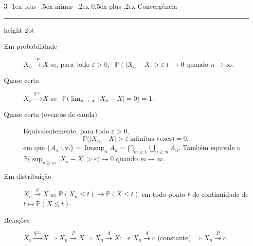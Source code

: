 \documentclass[10pt,landscape]{article}
\makeatletter
\renewcommand{\P}{\mathbb{P}}
\newcommand{\qc}{\xrightarrow{q.c.}}
\newcommand{\dto}{\xrightarrow{d}}
\newcommand{\pto}{\xrightarrow{P}}
\renewcommand{\section}{\@startsection{section}{1}{0mm}%
                                {-1ex plus -.5ex minus -.2ex}%
                                {0.5ex plus .2ex}%
                                {\normalfont\small\bfseries}}
\newcommand{\secrule}{\smallskip \hrule height 2pt \smallskip}
\makeatother
\begin{document}
\begin{multicols}{3}
\section{Convergência}\secrule
\begin{description}
  \item[Em probabilidade] $X_n\pto X$ se, para todo $\varepsilon>0$, \ $\P(|X_n-X|>\varepsilon)\to0$ quando $n\to\infty$.
  \item[Quase certa] $X_n\qc X$ se \ $\P\big(\lim_{n\to\infty}|X_n-X|=0\big)=1$.
  \item[Quase certa (eventos de cauda)] Equivalentemente, para todo $\varepsilon>0$,
  \[\P\big(|X_n-X|>\varepsilon\ \text{infinitas vezes}\big)=0,\]
  em que $\{A_n\text{ i.v.}\}=\limsup_nA_n=\bigcap_{m\ge1}\bigcup_{n\ge m}A_n$. Também equivale a $\P\big(\sup_{n\ge m}|X_n-X|>\varepsilon\big)\to0$ quando $m\to\infty$.
  \item[Em distribuição] $X_n\dto X$ se $\P(X_n\le t)\to\P(X\le t)$ em todo ponto $t$ de continuidade de $t\mapsto\P(X\le t)$.
  \item[Relações] $X_n\qc X\Rightarrow X_n\pto X\Rightarrow X_n\dto X$; \ e $X_n\dto c$ (constante) $\Rightarrow X_n\pto c$.
\end{description}


\end{multicols}
\end{document}
